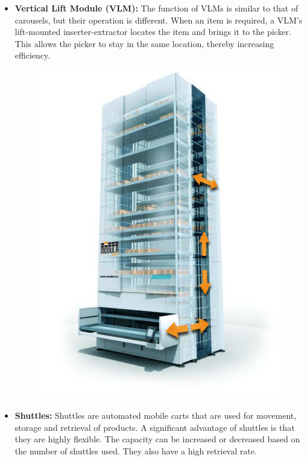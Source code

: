 \documentclass{report}
\begin{document}
\begin{itemize}
\begin{figure}[H]
\end{figure}

\item {\bfseries Vertical Lift Module (VLM):}
The function of VLMs is similar to that of carousels, but their operation is different. When an item is required, a VLM's lift-mounted inserter-extractor locates the item and brings it to the picker. This allows the picker to stay in the same location, thereby increasing efficiency. 

\begin{figure}[H]
    
    \centering
    \includegraphics[scale=0.4]{vlm.jpg}
    \caption{}
    
\end{figure}

\item {\bfseries Shuttles:} Shuttles are automated mobile carts that are used for movement, storage and retrieval of products. A significant advantage of shuttles is that they are highly flexible. The capacity can be increased or decreased based on the number of shuttles used. They also have a high retrieval rate. 


\end{itemize}
\end{document}

